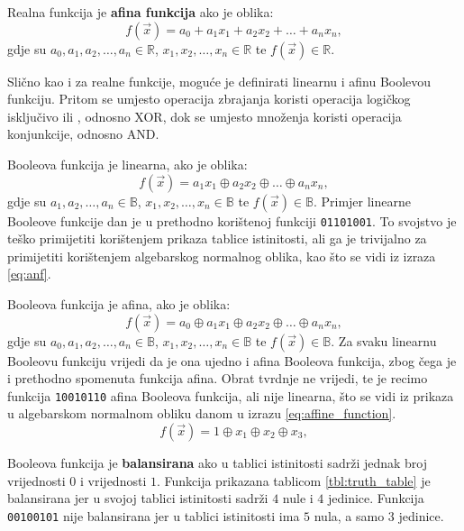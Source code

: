 Realna funkcija je \textbf{afina funkcija} ako je oblika:
\begin{equation}\label{eq:affine_definition}
    f(\vec{x}) = a_0 + a_1x_1 + a_2x_2 + \dots + a_nx_n,
\end{equation}
gdje su $a_0, a_1, a_2, \dots, a_n \in \mathds{R}$, $x_1, x_2, \dots, x_n \in \mathds{R}$ te $f(\vec{x}) \in \mathds{R}$.

Slično kao i za realne funkcije, moguće je definirati linearnu i afinu Boolevou funkciju.
Pritom se umjesto operacija zbrajanja koristi operacija logičkog isključivo ili , odnosno XOR, dok se umjesto množenja koristi operacija konjunkcije, odnosno AND.

Booleova funkcija je linearna, ako je oblika:
\begin{equation}
    f(\vec{x}) = a_1x_1 \oplus a_2x_2 \oplus \dots \oplus a_nx_n,
\end{equation}
gdje su $a_1, a_2, \dots, a_n \in \mathds{B}$, $x_1, x_2, \dots, x_n \in \mathds{B}$ te $f(\vec{x}) \in \mathds{B}$.
Primjer linearne Booleove funkcije dan je u prethodno korištenoj funkciji \texttt{01101001}.
To svojstvo je teško primijetiti korištenjem prikaza tablice istinitosti, ali ga je trivijalno za primijetiti korištenjem algebarskog normalnog oblika, kao što se vidi iz izraza \eqref{eq:anf}.

Booleova funkcija je afina, ako je oblika:
\begin{equation}
    f(\vec{x}) = a_0 \oplus a_1x_1 \oplus a_2x_2 \oplus \dots \oplus a_nx_n,
\end{equation}
gdje su $a_0, a_1, a_2, \dots, a_n \in \mathds{B}$, $x_1, x_2, \dots, x_n \in \mathds{B}$ te $f(\vec{x}) \in \mathds{B}$.
Za svaku linearnu Booleovu funkciju vrijedi da je ona ujedno i afina Booleova funkcija, zbog čega je i prethodno spomenuta funkcija afina.
Obrat tvrdnje ne vrijedi, te je recimo funkcija \texttt{10010110} afina Booleova funkcija, ali nije linearna, što se vidi iz prikaza u algebarskom normalnom obliku danom u izrazu \eqref{eq:affine_function}.
\begin{equation} \label{eq:affine_function}
    f(\vec{x}) = 1 \oplus x_1 \oplus x_2 \oplus x_3,
\end{equation}

Booleova funkcija je \textbf{balansirana} ako u tablici istinitosti sadrži jednak broj vrijednosti $0$ i vrijednosti $1$.
Funkcija prikazana tablicom \ref{tbl:truth_table} je balansirana jer u svojoj tablici istinitosti sadrži $4$ nule i $4$ jedinice.
Funkcija \texttt{00100101} nije balansirana jer u tablici istinitosti ima $5$ nula, a samo $3$ jedinice. 


